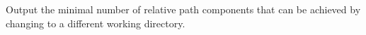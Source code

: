 
    Output the minimal number of relative path components that can be achieved by
    changing to a different working directory.
